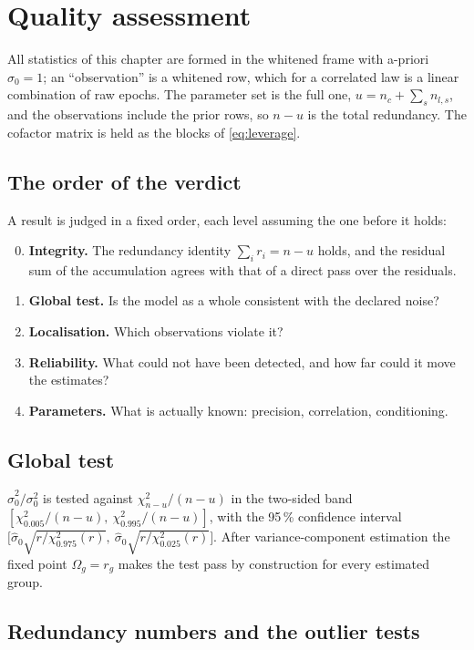 \chapter{Quality assessment}\label{ch:quality}

All statistics of this chapter are formed in the whitened frame with a-priori $\sigma_0=1$; an
``observation'' is a whitened row, which for a correlated law is a linear combination of raw
epochs. The parameter set is the full one, $u=n_c+\sum_sn_{l,s}$, and the observations include the
prior rows, so $n-u$ is the total redundancy. The cofactor matrix is held as the blocks of
\eqref{eq:leverage}.

\section{The order of the verdict}

A result is judged in a fixed order, each level assuming the one before it holds:
\begin{enumerate}
\setcounter{enumi}{-1}
\item \textbf{Integrity.} The redundancy identity $\sum_ir_i=n-u$ holds, and the residual sum of
  the accumulation agrees with that of a direct pass over the residuals.
\item \textbf{Global test.} Is the model as a whole consistent with the declared noise?
\item \textbf{Localisation.} Which observations violate it?
\item \textbf{Reliability.} What could not have been detected, and how far could it move the
  estimates?
\item \textbf{Parameters.} What is actually known: precision, correlation, conditioning.
\end{enumerate}

\section{Global test}

$\hat\sigma_0^2/\sigma_0^2$ is tested against $\chi^2_{n-u}/(n-u)$ in the two-sided band
$[\chi^2_{0.005}/(n-u),\ \chi^2_{0.995}/(n-u)]$, with the 95\,\% confidence interval
$\bigl[\hat\sigma_0\sqrt{r/\chi^2_{0.975}(r)},\ \hat\sigma_0\sqrt{r/\chi^2_{0.025}(r)}\bigr]$. After
variance-component estimation the fixed point $\Omega_g=r_g$ makes the test pass by construction
for every estimated group.

\section{Redundancy numbers and the outlier tests}\label{sec:redundancy}

